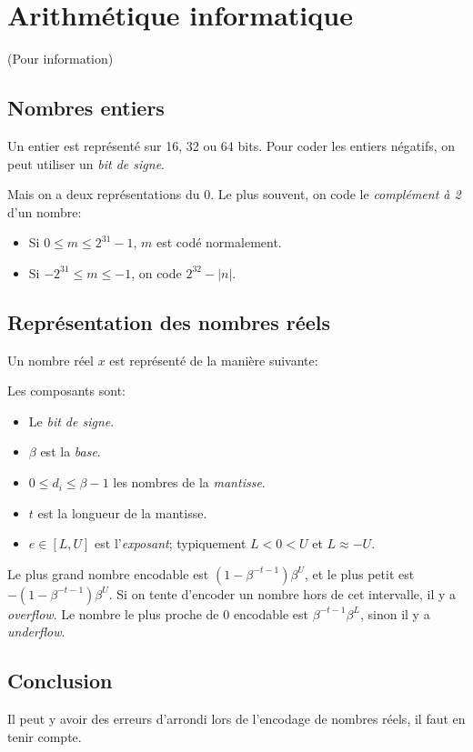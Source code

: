 \chapter{Arithmétique informatique}

(Pour information)

\section{Nombres entiers}

Un entier est représenté sur 16, 32 ou 64 bits.
Pour coder les entiers négatifs, on peut utiliser un \textit{bit de signe}.

Mais on a deux représentations du $0$.
Le plus souvent, on code le \textit{complément à 2} d'un nombre:
\begin{itemize}
\item Si $0 \le m \le 2^{31} - 1$, $m$ est codé normalement.
\item Si $-2^{31} \le m \le - 1$, on code $2^{32} - |n|$.
\end{itemize}


\section{Représentation des nombres réels}

Un nombre réel $x$ est représenté de la manière suivante:


Les composants sont:
\begin{itemize}
\item Le \textit{bit de signe}.
\item $\beta$ est la \textit{base}.
\item $0 \le d_i \le \beta - 1$ les nombres de la \textit{mantisse}.
\item $t$ est la longueur de la mantisse.
\item $e \in [L,U]$ est l'\textit{exposant}; typiquement $L < 0 < U$ et $L \approx -U$.
\end{itemize}

Le plus grand nombre encodable est $(1 - \beta^{-t-1}) \beta^U$, et le plus petit est $-(1 - \beta^{-t-1}) \beta^U$.
Si on tente d'encoder un nombre hors de cet intervalle, il y a \textit{overflow}.
Le nombre le plus proche de $0$ encodable est $\beta^{-t-1} \beta^L$, sinon il y a \textit{underflow}.

\section{Conclusion}

Il peut y avoir des erreurs d'arrondi lors de l'encodage de nombres réels, il faut en tenir compte.
